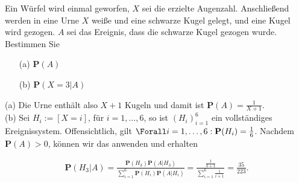 \begin{exercise}

Ein Würfel wird einmal geworfen, $X$ sei die erzielte Augenzahl. Anschließend werden in eine Urne $X$ weiße und eine schwarze Kugel gelegt, und eine Kugel wird gezogen. $A$ sei das Ereignis, dass die schwarze Kugel gezogen wurde. Bestimmen Sie

\begin{itemize}
  \item[(a)] $\mathbf{P}(A)$
  \item[(b)] $\mathbf{P}(X = 3 | A)$
\end{itemize}

\end{exercise}


\begin{solution}

(a) Die Urne enthält also $X + 1$ Kugeln und damit ist $\mathbf{P}(A) = \frac{1}{X + 1}$. \\

(b) Sei $H_i := [X = i]$, für $i = 1, \ldots, 6$, so ist $(H_i)_{i=1}^6$ ein vollständiges Ereignissystem. Offensichtlich, gilt $\Forall i = 1, \ldots, 6: \mathbf{P}(H_i) = \frac{1}{6}$. Nachdem $\mathbf{P}(A) > 0$, können wir das  anwenden und erhalten

\begin{align*}
  \mathbf{P}(H_3 | A)
  =
  \frac
  {\mathbf{P}(H_3) \mathbf{P}(A | H_3)}
  {\sum_{i=1}^6 \mathbf{P}(H_i) \mathbf{P}(A | H_i)}
  =
  \frac
  {\frac{1}{3+1}}
  {\sum_{i=1}^6 \frac{1}{i+1}}
  = \frac{35}{223}.
\end{align*}

\end{solution}
